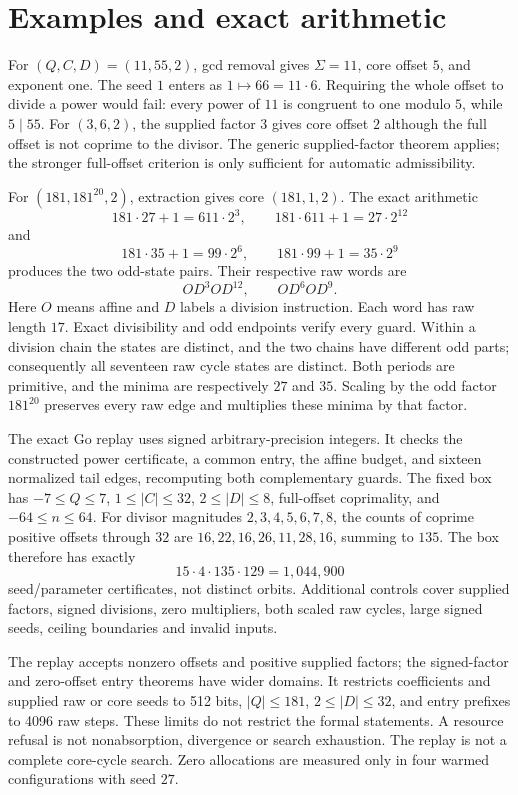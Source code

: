 \documentclass[11pt,letterpaper]{article}
\begin{document}
\section{Examples and exact arithmetic}

For \((Q,C,D)=(11,55,2)\), gcd removal gives \(\Sigma=11\), core offset
\(5\), and exponent one. The seed \(1\) enters as
\(1\mapsto66=11\cdot6\). Requiring the whole offset to divide a power
would fail: every power of \(11\) is congruent to one modulo \(5\), while
\(5\mid55\). For \((3,6,2)\), the supplied factor \(3\) gives core offset
\(2\) although the full offset is not coprime to the divisor. The generic
supplied-factor theorem applies; the stronger full-offset criterion is only
sufficient for automatic admissibility.

For \((181,181^{20},2)\), extraction gives core \((181,1,2)\).
The exact arithmetic
\[
181\cdot27+1=611\cdot2^3,\qquad
181\cdot611+1=27\cdot2^{12}
\]
and
\[
181\cdot35+1=99\cdot2^6,\qquad
181\cdot99+1=35\cdot2^9
\]
produces the two odd-state pairs.
Their respective raw words are
\[
O D^3 O D^{12},\qquad O D^6 O D^9.
\]
Here \(O\) means affine and \(D\) labels a division instruction. Each word
has raw length \(17\). Exact divisibility and odd endpoints verify every guard.
Within a division chain the states are distinct, and the two chains have
different odd parts; consequently all seventeen raw cycle states are
distinct. Both periods are primitive, and the minima are respectively
\(27\) and \(35\). Scaling by the odd factor \(181^{20}\) preserves
every raw edge and multiplies these minima by that factor.

The exact Go replay uses signed arbitrary-precision integers. It checks the
constructed power certificate, a common entry, the affine budget, and
sixteen normalized tail edges, recomputing both complementary guards.
The fixed box has \(-7\le Q\le7\), \(1\le|C|\le32\),
\(2\le|D|\le8\), full-offset coprimality, and \(-64\le n\le64\).
For divisor magnitudes \(2,3,4,5,6,7,8\), the counts of coprime positive
offsets through \(32\) are \(16,22,16,26,11,28,16\), summing to \(135\).
The box therefore has exactly
\[
15\cdot4\cdot135\cdot129=1{,}044{,}900
\]
seed/parameter certificates, not distinct orbits. Additional controls cover
supplied factors, signed divisions, zero multipliers, both scaled raw cycles,
large signed seeds, ceiling boundaries and invalid inputs.

The replay accepts nonzero offsets and positive supplied factors;
the signed-factor and zero-offset entry theorems have wider domains.
It restricts coefficients and supplied raw or core seeds to 512 bits,
\(|Q|\le181\), \(2\le|D|\le32\), and entry prefixes to 4096 raw steps.
These limits do not restrict the formal statements. A resource refusal is
not nonabsorption, divergence or search exhaustion. The replay is not a
complete core-cycle search. Zero allocations are measured only in four
warmed configurations with seed \(27\).
\end{document}
